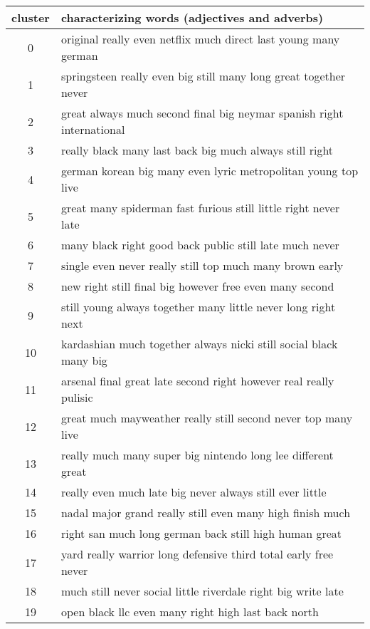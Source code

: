 \begin{tabular}{cl}\toprule cluster & characterizing words (adjectives and adverbs) \\\toprule
0 & original really even netflix much direct last young many german \\
1 & springsteen really even big still many long great together never \\
2 & great always much second final big neymar spanish right international \\
3 & really black many last back big much always still right \\
4 & german korean big many even lyric metropolitan young top live \\
5 & great many spiderman fast furious still little right never late \\
6 & many black right good back public still late much never \\
7 & single even never really still top much many brown early \\
8 & new right still final big however free even many second \\
9 & still young always together many little never long right next \\
10 & kardashian much together always nicki still social black many big \\
11 & arsenal final great late second right however real really pulisic \\
12 & great much mayweather really still second never top many live \\
13 & really much many super big nintendo long lee different great \\
14 & really even much late big never always still ever little \\
15 & nadal major grand really still even many high finish much \\
16 & right san much long german back still high human great \\
17 & yard really warrior long defensive third total early free never \\
18 & much still never social little riverdale right big write late \\
19 & open black llc even many right high last back north \\
\bottomrule\end{tabular}